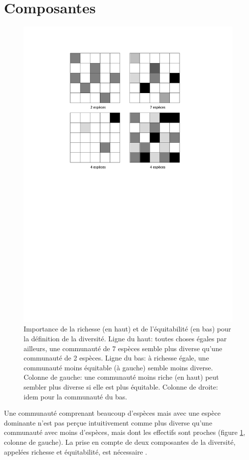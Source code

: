 \documentclass[
  11pt,
  french,
  a4paper,
  extrafontsizes,onecolumn,openright
  ]{memoir}
\begin{document}
\scriptsize

\normalsize

\hypertarget{composantes}{%
\section{Composantes}\label{composantes}}



\scriptsize

\begin{figure}

{\centering \includegraphics[width=0.6\linewidth]{images/Composantes} 

}

\caption{Importance de la richesse (en haut) et de l'équitabilité (en bas) pour la définition de la diversité. Ligne du haut: toutes choses égales par ailleurs, une communauté de 7 espèces semble plus diverse qu'une communauté de 2 espèces. Ligne du bas: à richesse égale, une communauté moins équitable (à gauche) semble moins diverse. Colonne de gauche: une communauté moins riche (en haut) peut sembler plus diverse si elle est plus équitable. Colonne de droite: idem pour la communauté du bas.}\label{fig:Composantes}
\end{figure}

\normalsize

Une communauté comprenant beaucoup d'espèces mais avec une espèce dominante n'est pas perçue intuitivement comme plus diverse qu'une communauté avec moins d'espèces, mais dont les effectifs sont proches (figure \ref{fig:Composantes}, colonne de gauche).
La prise en compte de deux composantes de la diversité, appelées richesse et équitabilité, est nécessaire \autocite{Whittaker1965}.
\end{document}
